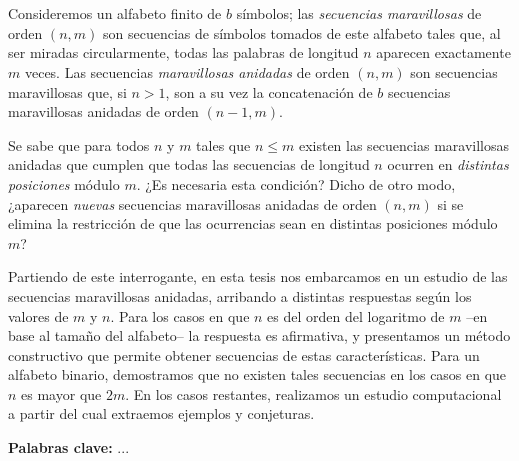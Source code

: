 \chapter*{\runtitulo}

Consideremos un alfabeto finito de $b$ símbolos; las \emph{secuencias maravillosas}
de orden $(n,m)$ son secuencias de símbolos tomados de este alfabeto
tales que, al ser miradas circularmente, todas las
palabras de longitud $n$ aparecen exactamente $m$ veces.
Las secuencias \emph{maravillosas anidadas} de orden $(n,m)$ son secuencias
maravillosas que, si $n > 1$, son a su vez la concatenación de $b$ secuencias
maravillosas anidadas de orden $(n-1, m)$.

Se sabe que para todos $n$ y $m$ tales que $n \leq m$ existen las secuencias
maravillosas anidadas que cumplen que todas las secuencias de longitud $n$
ocurren en \emph{distintas posiciones} módulo $m$.
¿Es necesaria esta condición? Dicho de otro modo, ¿aparecen \emph{nuevas} secuencias
maravillosas anidadas de orden $(n,m)$ si se elimina la restricción de que las
ocurrencias sean en distintas posiciones módulo $m$?

Partiendo de este interrogante, en esta tesis nos embarcamos en un estudio de
las secuencias maravillosas anidadas, arribando a distintas respuestas según los
valores de $m$ y $n$. Para los casos en que $n$ es del orden del logaritmo de
$m$ --en base al tamaño del alfabeto-- la respuesta es afirmativa, y presentamos
un método constructivo que permite obtener secuencias de estas características.
Para un alfabeto binario, demostramos que no existen tales secuencias en
los casos en que $n$ es mayor que $2m$.
En los casos restantes, realizamos un estudio computacional a partir
del cual extraemos ejemplos y conjeturas.

\bigskip

\noindent\textbf{Palabras clave:} ...